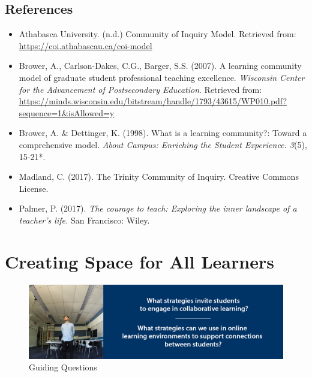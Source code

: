 \documentclass[
]{book}
\providecommand{\tightlist}{%
  \setlength{\itemsep}{0pt}\setlength{\parskip}{0pt}}
\begin{document}
\hypertarget{references-1}{%
\section*{References}\label{references-1}}

\begin{itemize}
\tightlist
\item
  Athabasca University. (n.d.) Community of Inquiry Model. Retrieved from: \url{https://coi.athabascau.ca/coi-model}\\
\item
  Brower, A., Carlson-Dakes, C.G., Barger, S.S. (2007). A learning community model of graduate student professional teaching excellence. \emph{Wisconsin Center for the Advancement of Postsecondary Education}. Retrieved from: \url{https://minds.wisconsin.edu/bitstream/handle/1793/43615/WP010.pdf?sequence=1\&isAllowed=y}\\
\item
  Brower, A. \& Dettinger, K. (1998). What is a learning community?: Toward a comprehensive model. \emph{About Campus: Enriching the Student Experience. 3}(5), 15-21*.\\
\item
  Madland, C. (2017). The Trinity Community of Inquiry. Creative Commons License.\\
\item
  Palmer, P. (2017). \emph{The courage to teach: Exploring the inner landscape of a teacher's life.} San Francisco: Wiley.
\end{itemize}

\hypertarget{creating-space-for-all-learners}{%
\chapter{Creating Space for All Learners}\label{creating-space-for-all-learners}}

\begin{figure}
\centering
\includegraphics{assets/unit5/LDRS664-BannerUnit5.jpg}
\caption{Guiding Questions}
\end{figure}
\end{document}
